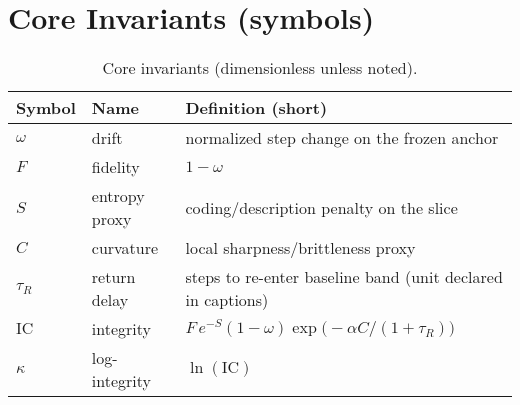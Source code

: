 \section{Core Invariants (symbols)}
\label{sec:glossary-core}
\begin{table}[H]
  \centering
  \caption{Core invariants (dimensionless unless noted).}
  \label{tab:glossary-core}
  \footnotesize
  \begingroup\setlength{\tabcolsep}{6pt}
  \begin{tabularx}{\linewidth}{@{} l l >{\raggedright\arraybackslash}X @{}}
    \toprule
    Symbol & Name & Definition (short) \\
    \midrule
    $\omega$      & drift        & normalized step change on the frozen anchor \\
    $F$           & fidelity     & $1-\omega$ \\
    $S$           & entropy proxy& coding/description penalty on the slice \\
    $C$           & curvature    & local sharpness/brittleness proxy \\
    $\tau_{R}$    & return delay & steps to re-enter baseline band (unit declared in captions) \\
    $\mathrm{IC}$ & integrity    & $F\,e^{-S}(1-\omega)\exp\!\big(-\alpha C/(1+\tau_R)\big)$ \\
    $\kappa$      & log-integrity& $\ln(\mathrm{IC})$ \\
    \bottomrule
  \end{tabularx}
  \endgroup
\end{table}

